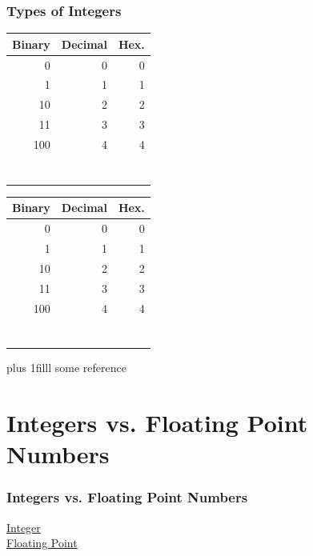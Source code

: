 \documentclass[fleqn]{beamer} %
\newcommand{\sectiontitleII}{Types of Integers}
\newcommand{\sectiontitleIII}{Integers vs. Floating Point Numbers}
\newcommand{\btVFill}{\vskip0pt plus 1filll}
\begin{document}
\begin{frame}[label=sectionII] \small
\frametitle{\sectiontitleII}
\bigskip

\begin{multicols}{2}
\begin{tabular}{|r|r|r|} \hline
	Binary 	& Decimal 	& Hex. \\ \hline
	0		& 0			& 0 		\\ \hline	
	1		& 1			& 1 		\\ \hline
	10		& 2			& 2 		\\ \hline
	11		& 3			& 3 		\\ \hline
	100		& 4			& 4 		\\ \hline
	& 			&  		\\ \hline
	& 			&  		\\ \hline
	& 			&  		\\ \hline
	& 			&  		\\ \hline
	& 			&  		\\ \hline
	& 		&  		\\ \hline
	& 		&  		\\ \hline
\end{tabular}

\begin{tabular}{|r|r|r|} \hline
	Binary\hspace{18mm} 	& Decimal 	& Hex. \\ \hline
	0		& 0			& 0 		\\ \hline	
	1		& 1			& 1 		\\ \hline
	10		& 2			& 2 		\\ \hline
	11		& 3			& 3 		\\ \hline
	100		& 4			& 4 		\\ \hline
	& 			&  		\\ \hline
	& 			&  		\\ \hline
	& 			&  		\\ \hline
	& 			&  		\\ \hline
	& 			&  		\\ \hline
	& 		&  		\\ \hline
	& 		&  		\\ \hline
\end{tabular}
\end{multicols}

\btVFill
\tiny{some reference}	
\end{frame}


\section{\sectiontitleIII}	
\begin{frame}[label=sectionIII] \small
\frametitle{\sectiontitleIII}
\begin{multicols}{2}
	\underline{Integer} \vspace{20mm}\\
	
	\underline{Floating Point} \vspace{20mm}\\
	
\end{multicols}
\end{frame}
\end{document}
